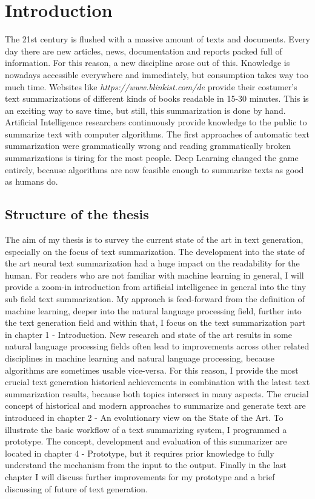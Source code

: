 \chapter{Introduction}\label{ch:intro}

The 21st century is flushed with a massive amount of texts and documents. Every day there are new articles, news, documentation and reports packed full of information. For this reason, a new discipline arose out of this. Knowledge is nowadays accessible everywhere and immediately, but consumption takes way too much time. Websites like \textit{https://www.blinkist.com/de} provide their costumer's text summarizations of different kinds of books readable in 15-30 minutes. This is an exciting way to save time, but still, this summarization is done by hand. Artificial Intelligence researchers continuously provide knowledge to the public to summarize text with computer algorithms. The first approaches of automatic text summarization were grammatically wrong and reading grammatically broken summarizations is tiring for the most people. Deep Learning changed the game entirely, because algorithms are now feasible enough to summarize texts as good as humans do.

\section{Structure of the thesis}
The aim of my thesis is to survey the current state of the art in text generation, especially on the focus of text summarization. The development into the state of the art neural text summarization had a huge impact on the readability for the human. For readers who are not familiar with machine learning in general, I will provide a zoom-in introduction from artificial intelligence in general into the tiny sub field text summarization. My approach is feed-forward from the definition of machine learning, deeper into the natural language processing field, further into the text generation field and within that, I focus on the text summarization part in chapter 1 - Introduction. New research and state of the art results in some natural language processing fields often lead to improvements across other related disciplines in machine learning and natural language processing, because algorithms are sometimes usable vice-versa. For this reason, I provide the most crucial text generation historical achievements in combination with the latest text summarization results, because both topics intersect in many aspects. The crucial concept of historical and modern approaches to summarize and generate text are introduced in chapter 2 - An evolutionary view on the State of the Art. 
To illustrate the basic workflow of a text summarizing system, I programmed a prototype. The concept, development and evaluation of this summarizer are located in chapter 4 - Prototype, but it requires prior knowledge to fully understand the mechanism from the input to the output. Finally in the last chapter I will discuss further improvements for my prototype and a brief discussing of future of text generation.

